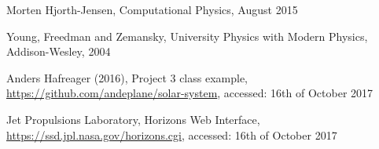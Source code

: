\documentclass[10pt,a4paper,titlepage]{article}
\begin{document}
\begin{flushleft}

\begin{thebibliography}{}

\singlespacing
\small




  
  Morten Hjorth-Jensen,
  Computational Physics,
  August 2015

  Young, Freedman and Zemansky,
  University Physics with Modern Physics,
  Addison-Wesley,
  2004

  Anders Hafreager (2016),
  Project 3 class example,
  \url{https://github.com/andeplane/solar-system},
  accessed: 16th of October 2017  
  
  Jet Propulsions Laboratory,
  Horizons Web Interface,
  \url{https://ssd.jpl.nasa.gov/horizons.cgi},
  accessed: 16th of October 2017
  
\end{thebibliography}
\end{flushleft}
\end{document}

